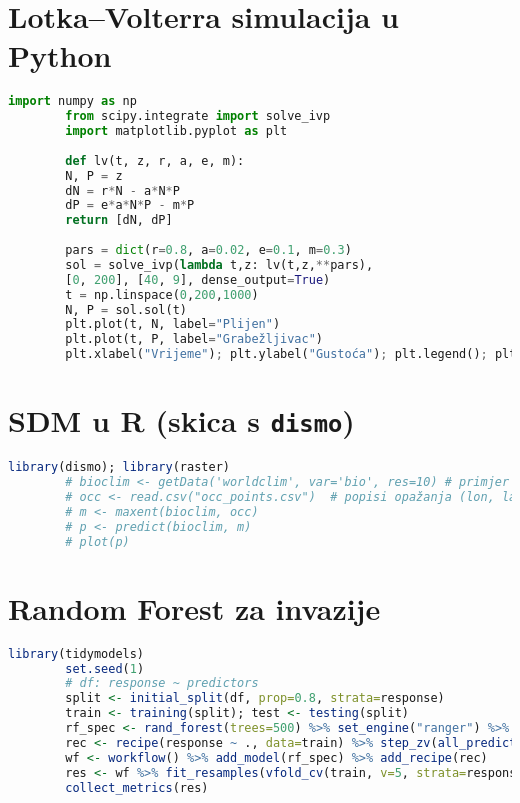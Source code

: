 \documentclass[12pt,oneside]{book}
\newcommand{\R}{\textsf{R}}
\newcommand{\Python}{\textsf{Python}}
\begin{document}
	\section{Lotka--Volterra simulacija u \Python{}}
	\begin{lstlisting}[language=Python,caption={Jednostavni LV model u Pythonu (scipy.integrate)}]
		import numpy as np
		from scipy.integrate import solve_ivp
		import matplotlib.pyplot as plt
		
		def lv(t, z, r, a, e, m):
		N, P = z
		dN = r*N - a*N*P
		dP = e*a*N*P - m*P
		return [dN, dP]
		
		pars = dict(r=0.8, a=0.02, e=0.1, m=0.3)
		sol = solve_ivp(lambda t,z: lv(t,z,**pars),
		[0, 200], [40, 9], dense_output=True)
		t = np.linspace(0,200,1000)
		N, P = sol.sol(t)
		plt.plot(t, N, label="Plijen")
		plt.plot(t, P, label="Grabežljivac")
		plt.xlabel("Vrijeme"); plt.ylabel("Gustoća"); plt.legend(); plt.show()
	\end{lstlisting}
	
	\section{SDM u \R{} (skica s \texttt{dismo})}
	\begin{lstlisting}[language=R,caption={SDM skica s bioklimatskim varijablama}]
		library(dismo); library(raster)
		# bioclim <- getData('worldclim', var='bio', res=10) # primjer dohvaćanja
		# occ <- read.csv("occ_points.csv")  # popisi opažanja (lon, lat)
		# m <- maxent(bioclim, occ)
		# p <- predict(bioclim, m)
		# plot(p)
	\end{lstlisting}
	
	\section{Random Forest za invazije}
	\begin{lstlisting}[language=R,caption={RF klasifikator s unakrsnom provjerom}]
		library(tidymodels)
		set.seed(1)
		# df: response ~ predictors
		split <- initial_split(df, prop=0.8, strata=response)
		train <- training(split); test <- testing(split)
		rf_spec <- rand_forest(trees=500) %>% set_engine("ranger") %>% set_mode("classification")
		rec <- recipe(response ~ ., data=train) %>% step_zv(all_predictors())
		wf <- workflow() %>% add_model(rf_spec) %>% add_recipe(rec)
		res <- wf %>% fit_resamples(vfold_cv(train, v=5, strata=response), metrics=metric_set(roc_auc,accuracy))
		collect_metrics(res)
	\end{lstlisting}
	
\end{document}
